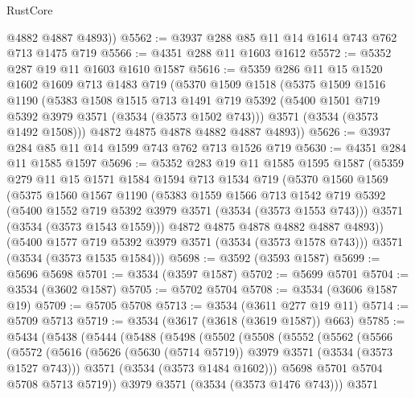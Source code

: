 \begin{lexlean}{RustCore}
\begin{coremodule}
        @4882
        @4887
        @4893))
@5562 := @3937 @288 @85 @11 @14 @1614 @743 @762 @713 @1475 @719
@5566 := @4351 @288 @11 @1603 @1612
@5572 := @5352 @287 @19 @11 @1603 @1610 @1587
@5616 := @5359
    @286
    @11
    @15
    @1520
    @1602
    @1609
    @713
    @1483
    @719
    (@5370
      @1509
      @1518
      (@5375
        @1509
        @1516
        @1190
        (@5383
          @1508
          @1515
          @713
          @1491
          @719
          @5392
          (@5400 @1501 @719 @5392 @3979 @3571 (@3534 (@3573 @1502 @743)))
          @3571
          (@3534 (@3573 @1492 @1508)))
        @4872
        @4875
        @4878
        @4882
        @4887
        @4893))
@5626 := @3937 @284 @85 @11 @14 @1599 @743 @762 @713 @1526 @719
@5630 := @4351 @284 @11 @1585 @1597
@5696 := @5352
    @283
    @19
    @11
    @1585
    @1595
    @1587
    (@5359
      @279
      @11
      @15
      @1571
      @1584
      @1594
      @713
      @1534
      @719
      (@5370
        @1560
        @1569
        (@5375
          @1560
          @1567
          @1190
          (@5383
            @1559
            @1566
            @713
            @1542
            @719
            @5392
            (@5400 @1552 @719 @5392 @3979 @3571 (@3534 (@3573 @1553 @743)))
            @3571
            (@3534 (@3573 @1543 @1559)))
          @4872
          @4875
          @4878
          @4882
          @4887
          @4893))
      (@5400 @1577 @719 @5392 @3979 @3571 (@3534 (@3573 @1578 @743)))
      @3571
      (@3534 (@3573 @1535 @1584)))
@5698 := @3592 (@3593 @1587)
@5699 := @5696 @5698
@5701 := @3534 (@3597 @1587)
@5702 := @5699 @5701
@5704 := @3534 (@3602 @1587)
@5705 := @5702 @5704
@5708 := @3534 (@3606 @1587 @19)
@5709 := @5705 @5708
@5713 := @3534 (@3611 @277 @19 @11)
@5714 := @5709 @5713
@5719 := @3534 (@3617 (@3618 (@3619 @1587)) @663)
@5785 := @5434
    (@5438
      (@5444
        (@5488
          (@5498
            (@5502
              (@5508
                (@5552
                  (@5562
                    (@5566
                      (@5572
                        (@5616
                          (@5626 (@5630 (@5714 @5719)) @3979 @3571 (@3534 (@3573 @1527 @743)))
                          @3571
                          (@3534 (@3573 @1484 @1602)))
                        @5698
                        @5701
                        @5704
                        @5708
                        @5713
                        @5719))
                    @3979
                    @3571
                    (@3534 (@3573 @1476 @743)))
                  @3571

\end{coremodule}
\end{lexlean}
